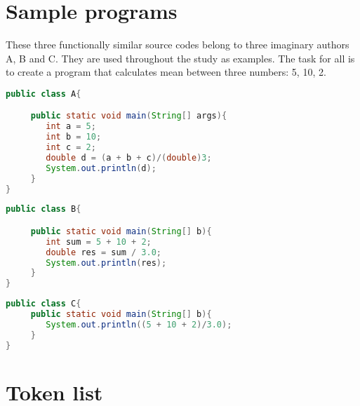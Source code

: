 \section{Sample programs} \label{appendix:programs}

These three functionally similar source codes belong to three imaginary authors A, B and C. They are used throughout the study as examples. The task for all is to create a program that calculates mean between three numbers: 5, 10, 2.

\begin{lstlisting}[language=Java, caption=Java example belonging to author A]
public class A{

     public static void main(String[] args){
        int a = 5;
        int b = 10;
        int c = 2;
        double d = (a + b + c)/(double)3;
        System.out.println(d);
     }
}
\end{lstlisting}

\begin{lstlisting}[language=Java, caption=Java example belonging to author B]
public class B{

     public static void main(String[] b){
        int sum = 5 + 10 + 2;
        double res = sum / 3.0;
        System.out.println(res);
     }
}
\end{lstlisting}

\begin{lstlisting}[language=Java, caption=Java example belonging to author C]
public class C{
     public static void main(String[] b){
        System.out.println((5 + 10 + 2)/3.0);
     }
}
\end{lstlisting}

\newpage

\section{Token list} \label{appendix:token-list}

